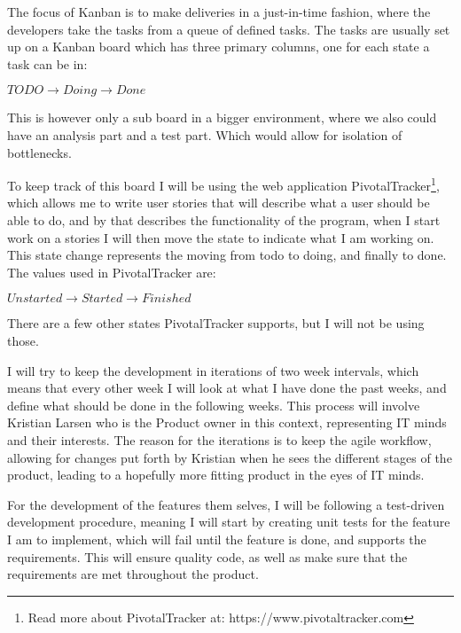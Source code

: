 The focus of Kanban is to make deliveries in a just-in-time fashion, where the
developers take the tasks from a queue of defined tasks. The tasks are usually
set up on a Kanban board which has three primary columns, one for each state a
task can be in: 

\begin{center}
  $TODO \rightarrow Doing \rightarrow Done$
\end{center}

This is however only a sub board in a bigger environment, where we also could
have an analysis part and a test part. Which would allow for isolation of
bottlenecks\cite{kanban}. 

To keep track of this board I will be using the web application
PivotalTracker\footnote{Read more about PivotalTracker at:
  https://www.pivotaltracker.com}, which allows me to write user stories that
will describe what a user should be able to do, and by that describes the
functionality of the program, when I start work on a stories I will then move
the state to indicate what I am working on. This state change represents the
moving from todo to doing, and finally to done. The values used in
PivotalTracker are: 

\begin{center}
  $Unstarted \rightarrow Started \rightarrow Finished$
\end{center}

There are a few other states PivotalTracker supports, but I will not be using
those. 

I will try to keep the development in iterations of two week intervals, which
means that every other week I will look at what I have done the past weeks, and define
what should be done in the following weeks. This process will involve Kristian Larsen
who is the Product owner in this context, representing IT minds and their
interests. The reason for the iterations is to keep the agile workflow, allowing
for changes put forth by Kristian when he sees the different stages of the
product, leading to a hopefully more fitting product in the eyes of IT minds. 

For the development of the features them selves, I will be following a
test-driven development procedure, meaning I will start by creating unit tests
for the feature I am to implement, which will fail until the feature is done,
and supports the requirements. This will ensure quality code, as well as make
sure that the requirements are met throughout the product. 

